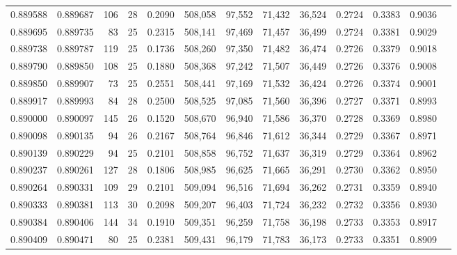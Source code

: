 \begin{tabular}{rrrrrrrrrrrrr}
0.889588 & 0.889687 &   106 &  28 &                                     0.2090 & 508,058 &  97,552 &  71,432 &  36,524 & 0.2724 & 0.3383 & 0.9036 \\
0.889695 & 0.889735 &    83 &  25 &                                     0.2315 & 508,141 &  97,469 &  71,457 &  36,499 & 0.2724 & 0.3381 & 0.9029 \\
0.889738 & 0.889787 &   119 &  25 &                                     0.1736 & 508,260 &  97,350 &  71,482 &  36,474 & 0.2726 & 0.3379 & 0.9018 \\
0.889790 & 0.889850 &   108 &  25 &                                     0.1880 & 508,368 &  97,242 &  71,507 &  36,449 & 0.2726 & 0.3376 & 0.9008 \\
0.889850 & 0.889907 &    73 &  25 &                                     0.2551 & 508,441 &  97,169 &  71,532 &  36,424 & 0.2726 & 0.3374 & 0.9001 \\
0.889917 & 0.889993 &    84 &  28 &                                     0.2500 & 508,525 &  97,085 &  71,560 &  36,396 & 0.2727 & 0.3371 & 0.8993 \\
0.890000 & 0.890097 &   145 &  26 &                                     0.1520 & 508,670 &  96,940 &  71,586 &  36,370 & 0.2728 & 0.3369 & 0.8980 \\
0.890098 & 0.890135 &    94 &  26 &                                     0.2167 & 508,764 &  96,846 &  71,612 &  36,344 & 0.2729 & 0.3367 & 0.8971 \\
0.890139 & 0.890229 &    94 &  25 &                                     0.2101 & 508,858 &  96,752 &  71,637 &  36,319 & 0.2729 & 0.3364 & 0.8962 \\
0.890237 & 0.890261 &   127 &  28 &                                     0.1806 & 508,985 &  96,625 &  71,665 &  36,291 & 0.2730 & 0.3362 & 0.8950 \\
0.890264 & 0.890331 &   109 &  29 &                                     0.2101 & 509,094 &  96,516 &  71,694 &  36,262 & 0.2731 & 0.3359 & 0.8940 \\
0.890333 & 0.890381 &   113 &  30 &                                     0.2098 & 509,207 &  96,403 &  71,724 &  36,232 & 0.2732 & 0.3356 & 0.8930 \\
0.890384 & 0.890406 &   144 &  34 &                                     0.1910 & 509,351 &  96,259 &  71,758 &  36,198 & 0.2733 & 0.3353 & 0.8917 \\
0.890409 & 0.890471 &    80 &  25 &                                     0.2381 & 509,431 &  96,179 &  71,783 &  36,173 & 0.2733 & 0.3351 & 0.8909 \\

\end{tabular}
